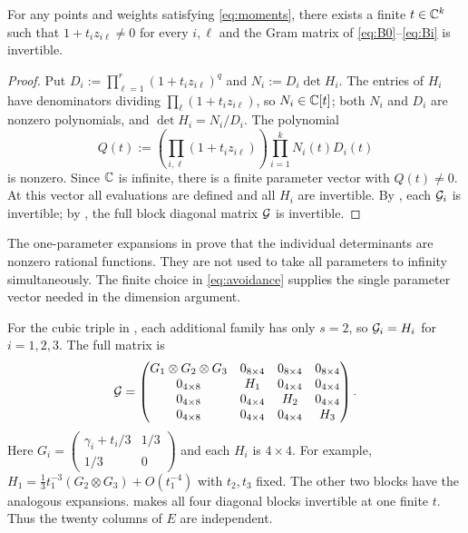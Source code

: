 \begin{proposition}\label{prop:nondegenerate}
For any points and weights satisfying \eqref{eq:moments}, there
exists a finite $t\in\mathbb C^k$ such that $1+t_i z_{i\ell}\ne0$
for every $i,\ell$ and the Gram matrix of
\eqref{eq:B0}--\eqref{eq:Bi} is invertible.
\end{proposition}
\begin{proof}
Put $D_i:=\prod_{\ell=1}^r(1+t_iz_{i\ell})^q$ and
$N_i:=D_i\det H_i$. The entries of $H_i$ have denominators dividing
$\prod_\ell(1+t_iz_{i\ell})$, so $N_i\in\mathbb C[t]$; both $N_i$ and $D_i$
are nonzero polynomials, and $\det H_i=N_i/D_i$. The polynomial
\begin{equation}\label{eq:avoidance}
Q(t):=\left(\prod_{i,\ell}(1+t_i z_{i\ell})\right)
\prod_{i=1}^kN_i(t)D_i(t)
\end{equation}
is nonzero. Since $\mathbb C$ is infinite, there is a finite parameter
vector with $Q(t)\ne0$. At this vector all evaluations are defined
and all $H_i$ are invertible. By , each $\mathcal G_i$ is
invertible; by , the full block diagonal matrix
$\mathcal G$ is invertible.
\end{proof}

The one-parameter expansions in  prove that the
individual determinants are nonzero rational functions. They are
not used to take all parameters to infinity simultaneously.
The finite choice in \eqref{eq:avoidance} supplies the single
parameter vector needed in the dimension argument.

\begin{example}\label{ex:twenty}
For the cubic triple in , each additional family has
only $s=2$, so $\mathcal G_i=H_i$ for $i=1,2,3$. The full matrix is
\begin{equation}\label{eq:twenty}
\mathcal G=
\begin{pmatrix}
G_1\otimes G_2\otimes G_3&0_{8\times4}&0_{8\times4}&0_{8\times4}\\
0_{4\times8}&H_1&0_{4\times4}&0_{4\times4}\\
0_{4\times8}&0_{4\times4}&H_2&0_{4\times4}\\
0_{4\times8}&0_{4\times4}&0_{4\times4}&H_3
\end{pmatrix}.
\end{equation}
Here $G_i=\left(\begin{smallmatrix}\gamma_i+t_i/3&1/3\\1/3&0\end{smallmatrix}\right)$
and each $H_i$ is $4\times4$. For example,
$H_1=\frac13t_1^{-3}(G_2\otimes G_3)+O(t_1^{-4})$ with $t_2,t_3$
fixed. The other two blocks have the analogous expansions.
 makes all four diagonal blocks invertible
at one finite $t$. Thus the twenty columns of $E$ are independent.
\end{example}

